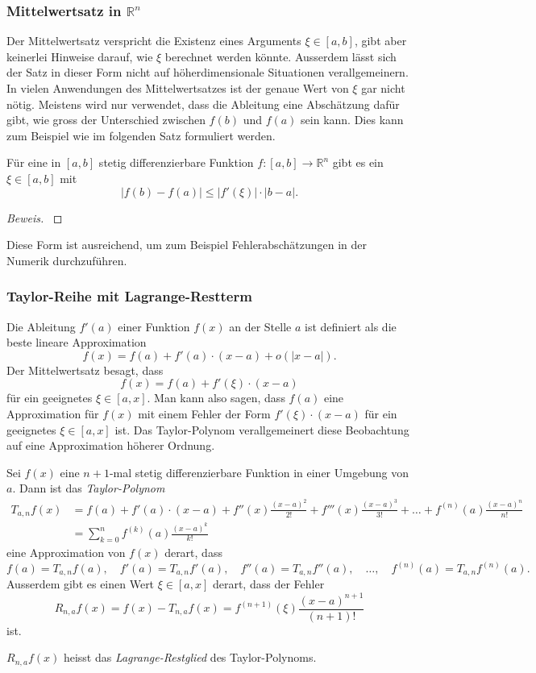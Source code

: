 \subsubsection{Mittelwertsatz in $\mathbb R^n$}
Der Mittelwertsatz verspricht die Existenz eines Arguments $\xi\in[a,b]$,
gibt aber keinerlei Hinweise darauf, wie $\xi$ berechnet werden könnte. 
Ausserdem lässt sich der Satz in dieser Form nicht auf höherdimensionale
Situationen verallgemeinern.
In vielen Anwendungen des Mittelwertsatzes ist der genaue Wert von $\xi$
gar nicht nötig.
Meistens wird nur verwendet, dass die Ableitung eine Abschätzung dafür
gibt, wie gross der Unterschied zwischen $f(b)$ und $f(a)$ sein kann.
Dies kann zum Beispiel wie im folgenden Satz formuliert werden.

\begin{satz}
Für eine in $[a,b]$ stetig differenzierbare Funktion
$f\colon [a,b]\to\mathbb R^n$ gibt es ein $\xi\in[a,b]$ mit
\[
|f(b)-f(a)| \le |f'(\xi)|\cdot |b-a|.
\]
\end{satz}

\begin{proof}[Beweis]
\cite[(8.5.1)]{buch:dieudonne}
\end{proof}

Diese Form ist ausreichend, um zum Beispiel Fehlerabschätzungen in der
Numerik durchzuführen.

\subsubsection{Taylor-Reihe mit Lagrange-Restterm}
Die Ableitung $f'(a)$ einer Funktion $f(x)$ an der Stelle $a$ ist definiert
als die beste lineare Approximation
\[
f(x) = f(a) + f'(a)\cdot (x-a) + o(|x-a|).
\]
Der Mittelwertsatz besagt, dass
\[
f(x) = f(a) + f'(\xi) \cdot (x-a)
\]
für ein geeignetes $\xi\in[a,x]$.
Man kann also sagen, dass $f(a)$ eine Approximation für $f(x)$ mit einem
Fehler der Form $f'(\xi)\cdot(x-a)$ für ein geeignetes $\xi\in[a,x]$ ist.
Das Taylor-Polynom verallgemeinert diese Beobachtung auf eine Approximation
höherer Ordnung.

\begin{satz}
Sei $f(x)$ eine $n+1$-mal stetig differenzierbare Funktion in einer
Umgebung von $a$.
Dann ist das {\em Taylor-Polynom}
\begin{align*}
T_{a,n}f(x)
&=
f(a) + f'(a)\cdot (x-a) + f''(x)\frac{(x-a)^2}{2!} + f'''(x)\frac{(x-a)^3}{3!}
+\dots+f^{(n)}(a)\frac{(x-a)^n}{n!}
\\
&=
\sum_{k=0}^n
f^{(k)}(a) \frac{(x-a)^k}{k!}
\end{align*}
eine Approximation von $f(x)$ derart, dass
\[
f(a)=T_{a,n}f(a),\quad
f'(a)=T_{a,n}f'(a),\quad
f''(a)=T_{a,n}f''(a),\quad
\dots,\quad
f^{(n)}(a)=T_{a,n}f^{(n)}(a).
\]
Ausserdem gibt es einen Wert $\xi\in[a,x]$ derart, dass der Fehler
\[
R_{n,a}f(x)
=
f(x) - T_{n,a}f(x)
=
f^{(n+1)}(\xi)\frac{(x-a)^{n+1}}{(n+1)!}
\]
ist.
\end{satz}
$R_{n,a}f(x)$ heisst das {\em Lagrange-Restglied} des Taylor-Polynoms.

